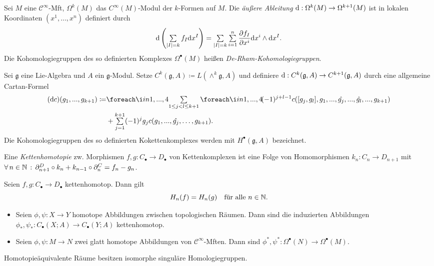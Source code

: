 \documentclass{cheat-sheet}
\newcommand{\nspace}[1]{\foreach \i in {1,...,#1}{ \! }} %
\newcommand{\CC}[1]{{#1}_{\bullet}} %
\newcommand{\Lg}{\mathfrak{g}} %
\begin{document}

\begin{defn}
  Sei $M$ eine $\mathcal{C}^\infty$-Mft, $\Omega^k(M)$ das $C^\infty(M)$-Modul der $k$-Formen auf $M$. Die \emph{äußere Ableitung} $\mathrm{d} : \Omega^k(M) \to \Omega^{k+1}(M)$ ist in lokalen Koordinaten $(x^1, \ldots, x^n)$ definiert durch
  \[ \d \left( \sum_{\abs{I} = k} f_I \d x^I \right) = \sum_{\abs{I} = k} \sum_{i=1}^n \frac{\partial f_I}{\partial x^i} \d x^i \wedge \d x^I. \]
  Die Kohomologiegruppen des so definierten Komplexes $\Omega^\bullet(M)$ heißen \emph{De-Rham-Kohomologiegruppen}.
\end{defn}


\begin{defn}
  Sei $\Lg$ eine Lie-Algebra und $A$ ein $\Lg$-Modul. Setze $C^k(\Lg, A) \coloneqq L(\wedge^k \Lg, A)$ und definiere $\d : C^k(\Lg, A) \to C^{k+1}(\Lg, A)$ durch eine allgemeine Cartan-Formel
  \begin{align*}
    (\d c)(g_1, \nldots, g_{k+1}) \coloneqq & \nspace{4} \sum_{1 \leq j < l \leq k+1} \nspace{4} (-1)^{j+l-1} c([g_j, g_l], g_1, \nldots, \hat{g_j}, \nldots, \hat{g_l}, \nldots, g_{k+1}) \\
    & + \sum_{j=1}^{k+1} (-1)^j g_j c(g_1, \nldots, \hat{g_j}, \ldots, g_{k+1}).
  \end{align*}
  Die Kohomologiegruppen des so definierten Kokettenkomplexes werden mit $H^\bullet(\Lg, A)$ bezeichnet.
\end{defn}

\begin{defn}
  Eine \emph{Kettenhomotopie} zw. Morphismen $f, g : \CC{C} \to \CC{D}$ von Kettenkomplexen ist eine Folge von Homomorphismen $k_n : C_n \to D_{n+1}$ mit
  $\forall \, {n \in \mathbb{N}} \,:\, \partial^D_{n+1} \circ k_n + k_{n-1} \circ \partial^C_n = f_n - g_n$.
\end{defn}

\begin{lem}
  Seien $f, g : \CC{C} \to \CC{D}$ kettenhomotop. Dann gilt
  \[ H_n(f) = H_n(g) \quad \text{für alle $n \in \mathbb{N}$.} \]
\end{lem}

\begin{prop}
  \begin{itemize}
    \item Seien $\phi, \psi : X \to Y$ homotope Abbildungen zwischen topologischen Räumen. Dann sind die induzierten Abbildungen $\phi_*, \psi_* : \CC{C}(X; A) \to \CC{C}(Y; A)$ kettenhomotop.
    \item Seien $\phi, \psi : M \to N$ zwei glatt homotope Abbildungen von $\mathcal{C}^\infty$-Mften. Dann sind $\phi^*, \psi^* : \Omega^\bullet(N) \to \Omega^\bullet(M)$.
  \end{itemize}
\end{prop}

\begin{kor}
  Homotopieäquivalente Räume besitzen isomorphe singuläre Homologiegruppen.
\end{kor}
\end{document}
